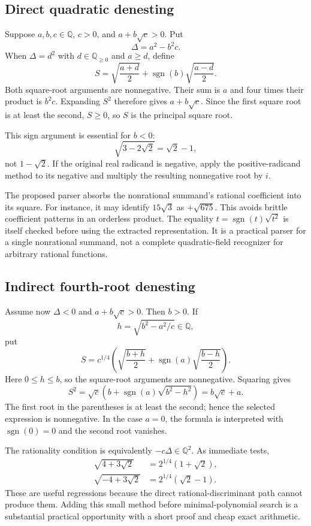 \documentclass[11pt,letterpaper]{article}
\newcommand{\Q}{\mathbb Q}
\DeclareMathOperator{\sgn}{sgn}
\theoremstyle{definition}
\begin{document}
\subsection{Direct quadratic denesting}

Suppose $a,b,c\in\Q$, $c>0$, and $a+b\sqrt c>0$. Put
\[
 \Delta=a^2-b^2c.
\]
When $\Delta=d^2$ with $d\in\Q_{\ge0}$ and $a\ge d$, define
\begin{equation}\label{eq:direct}
 S=\sqrt{\frac{a+d}{2}}+\sgn(b)\sqrt{\frac{a-d}{2}}.
\end{equation}
Both square-root arguments are nonnegative. Their sum is $a$ and four times their product is $b^2c$. Expanding $S^2$ therefore gives $a+b\sqrt c$. Since the first square root is at least the second, $S\ge0$, so $S$ is the principal square root.

This sign argument is essential for $b<0$:
\[
 \sqrt{3-2\sqrt2}=\sqrt2-1,
\]
not $1-\sqrt2$. If the original real radicand is negative, apply the positive-radicand method to its negative and multiply the resulting nonnegative root by $i$.

The proposed parser absorbs the nonrational summand's rational coefficient into its square. For instance, it may identify $15\sqrt3$ as $+\sqrt{675}$. This avoids brittle coefficient patterns in an orderless product. The equality $t=\sgn(t)\sqrt{t^2}$ is itself checked before using the extracted representation. It is a practical parser for a single nonrational summand, not a complete quadratic-field recognizer for arbitrary rational functions.

\subsection{Indirect fourth-root denesting}

Assume now $\Delta<0$ and $a+b\sqrt c>0$. Then $b>0$. If
\[
 h=\sqrt{b^2-a^2/c}\in\Q,
\]
put
\begin{equation}\label{eq:indirect}
 S=c^{1/4}\left(
 \sqrt{\frac{b+h}{2}}+\sgn(a)\sqrt{\frac{b-h}{2}}\right).
\end{equation}
Here $0\le h\le b$, so the square-root arguments are nonnegative. Squaring gives
\[
 S^2=\sqrt c\left(b+\sgn(a)\sqrt{b^2-h^2}\right)=b\sqrt c+a.
\]
The first root in the parentheses is at least the second; hence the selected expression is nonnegative. In the case $a=0$, the formula is interpreted with $\sgn(0)=0$ and the second root vanishes.

The rationality condition is equivalently $-c\Delta\in\Q^2$. As immediate tests,
\begin{align*}
 \sqrt{4+3\sqrt2}&=2^{1/4}(1+\sqrt2),\\
 \sqrt{-4+3\sqrt2}&=2^{1/4}(\sqrt2-1).
\end{align*}
These are useful regressions because the direct rational-discriminant path cannot produce them. Adding this small method before minimal-polynomial search is a substantial practical opportunity with a short proof and cheap exact arithmetic.
\end{document}
